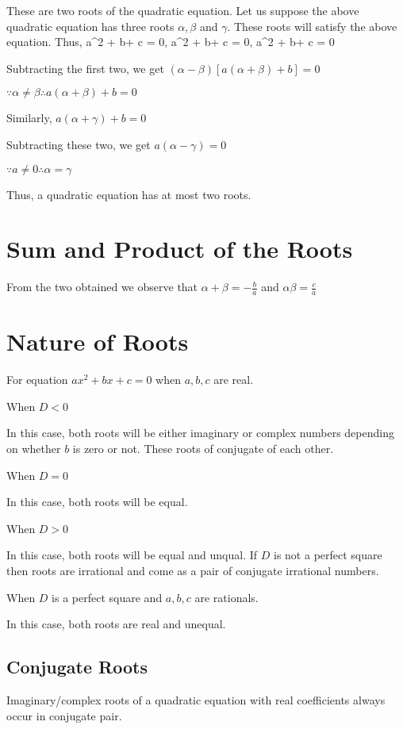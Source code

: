 These are two roots of the quadratic equation. Let us suppose the above quadratic equation has three roots $\alpha, \beta$ and
$\gamma$. These roots will satisfy the above equation. Thus,
\startformula a\alpha^2 + b\alpha + c = 0, a\beta^2 + b\beta + c = 0, a\gamma^2 + b\gamma + c = 0\stopformula

Subtracting the first two, we get $(\alpha - \beta)[a(\alpha + \beta) + b] = 0$

$\because \alpha \neq \beta \therefore a(\alpha + \beta) + b = 0$

Similarly, $a(\alpha + \gamma) + b = 0$

Subtracting these two, we get $a(\alpha - \gamma) = 0$

$\because a\neq 0 \therefore \alpha = \gamma$

Thus, a quadratic equation has at most two roots.

\section{Sum and Product of the Roots}
From the two obtained  we observe that $\alpha + \beta = -\frac{b}{a}$ and $\alpha\beta = \frac{c}{a}$

\section{Nature of Roots}
For equation $ax^2 + bx + c = 0$ when $a,b,c$ are real.
\startitemize[n]
\item When $D < 0$

  In this case, both roots will be either imaginary or complex numbers depending on whether $b$ is zero or not. These roots of
  conjugate of each other.
\item When $D = 0$

  In this case, both roots will be equal.
\item When $D > 0$

  In this case, both roots will be equal and unqual. If $D$ is not a perfect square then roots are irrational and come as a pair of
  conjugate irrational numbers.
\item When $D$ is a perfect square and $a, b, c$ are rationals.

  In this case, both roots are real and unequal.
\stopitemize

\subsection{Conjugate Roots}
Imaginary/complex roots of a quadratic equation with real coefficients always occur in conjugate pair.

